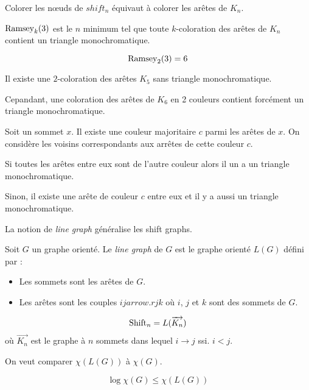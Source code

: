 Colorer les nœuds de $shift_n$ équivaut à colorer les arêtes de $K_n$.

\begin{definition}
	$\operatorname{Ramsey}_k(3)$ est le $n$ minimum tel que toute $k$-coloration des arêtes de $K_n$ contient un triangle monochromatique.
\end{definition}

\begin{lm}{}{}
	\[ \operatorname{Ramsey}_2(3) = 6 \]
\end{lm}

\begin{preuve}
	Il existe une $2$-coloration des arêtes $K_5$ sans triangle monochromatique.
	
	Cepandant, une coloration des arêtes de $K_6$ en 2 couleurs contient forcément un triangle monochromatique.
	
	Soit un sommet $x$. Il existe une couleur majoritaire $c$ parmi les arêtes de $x$. On considère les voisins correspondants aux arrêtes de cette couleur $c$.
	
	Si toutes les arêtes entre eux sont de l'autre couleur alors il un a un triangle monochromatique.
	
	Sinon, il existe une arête de couleur $c$ entre eux et il y a aussi un triangle monochromatique.
\end{preuve}

La notion de \emph{line graph} généralise les shift graphs.

\begin{definition}
	Soit $G$ un graphe orienté. Le \emph{line graph} de $G$ est le graphe orienté $L(G)$ défini par :
	
	\begin{itemize}
		\item Les sommets sont les arêtes de $G$.
		\item Les arêtes sont les couples $i j arrow.r j k$ où $i$, $j$ et $k$ sont des sommets de $G$.
	\end{itemize}
\end{definition}

\begin{exemple}
	\[ \operatorname{Shift}_n = L(\overrightarrow{K_n}) \] où $\overrightarrow{K_n}$ est le graphe à $n$ sommets dans lequel $i \to j$ ssi. $i < j$.
\end{exemple}

On veut comparer $\chi(L(G))$ à $\chi(G)$.

\begin{lemme}
	\[ \log \chi(G) \le \chi(L(G)) \]
\end{lemme}

